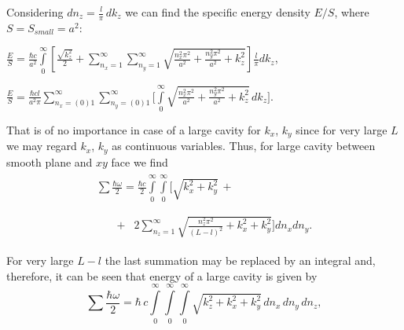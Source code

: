 \documentclass[twoside, 10pt]{article}
\begin{document}
\begin{multicols}{2}
    Considering \(dn_z = \frac{l}{\pi}\,dk_z\) we can find the specific energy density \(E/S\), where
\(S = S_{small} = a^2\):

\noindent
    \(\frac{E}{S} = \frac{\hbar c}{a^2}\int\limits_{0}^{\infty}\left[{\frac{\sqrt{k_z^2}}{2}+\sum\limits_{n_x=1}^{\infty}\sum\limits_{n_y=1}^{\infty}\sqrt{\frac{n_x^2\pi^2}{a^2}+\frac{n_y^2\pi^2}{a^2}+k_z^2}}\right]\frac{l}{\pi}dk_z\),

\noindent
    \(\frac{E}{S} = \frac{\hbar c l}{a^2 \pi} \sum\limits_{n_x=(0)1}^{\infty}
\sum\limits_{n_y=(0)1}^{\infty}\Bigg[\int\limits_{0}^{\infty}\sqrt{\frac{n_x^2\pi^2}{a^2}+\frac{n_y^2\pi^2}{a^2}+k_z^2}\,dk_z\Bigg]\).

    That is of no importance in case of a large cavity for \(k_x\), \(k_y\)
since for very large \(L\) we may regard \(k_x\), \(k_y\) as
continuous variables. Thus, for large cavity between smooth plane and \(xy\) face we find
\noindent
\begin{equation}\begin{array}{l}
\begin{array}{ll}
\sum\frac{\hbar\omega}{2} = \frac{\hbar c}{2}\int\limits_{0}^{\infty}\int\limits_{0}^{\infty}\Bigg[\sqrt{k_x^2+k_y^2}\,+ & \,\\
\end{array} \\
\begin{array}{rr}
\,\,\,\,\,\,\,\,\,\,\,+ & 2\sum\limits_{n_z=1}^{\infty}\sqrt{\frac{n_z^2 \pi^2}{(L-l)^2}+k_x^2+k_y^2}\Bigg]d{n_x}d{n_y}.\end{array}
\end{array}\end{equation}


For very large \(L-l\) the last summation may be replaced by an
integral and, therefore, it can be seen that energy of a large cavity is given by
\noindent
\begin{equation}\sum\frac{\hbar\omega}{2} = \hbar\,c\int\limits_{0}^{\infty}\int\limits_{0}^{\infty}\int\limits_{0}^{\infty}\sqrt{k_z^2+k_x^2+k_y^2}\,d{n_x}\,d{n_y}\,d{n_z},\end{equation}


\end{multicols}
\end{document}
